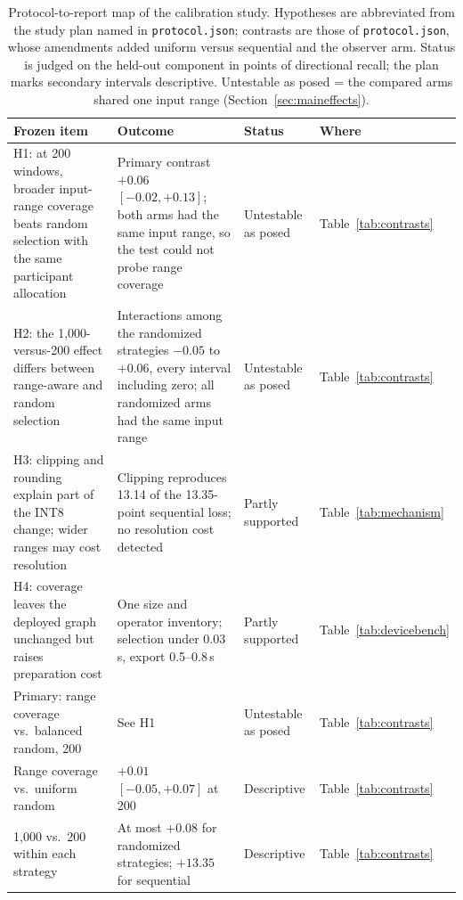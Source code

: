 \documentclass[10pt,twocolumn]{article}
\begin{document}
\begin{table}[!tp]
\centering
\caption{Protocol-to-report map of the calibration study. Hypotheses are
abbreviated from the study plan named in \texttt{protocol.json}; contrasts
are those of \texttt{protocol.json}, whose amendments added uniform versus
sequential and the observer arm. Status is judged on the held-out
component in points of directional recall; the plan marks secondary
intervals descriptive. Untestable as posed = the compared arms shared one
input range (Section~\ref{sec:maineffects}).}
\label{tab:protocolmap}
\small
\begin{tabular}{@{}p{}p{}ll@{}}
\toprule
Frozen item & Outcome & Status & Where \\
\midrule
\raggedright H1: at 200 windows, broader input-range coverage beats random
selection with the same participant allocation
  & \raggedright Primary contrast $+0.06$ $[-0.02, +0.13]$; both arms had
    the same input range, so the test could not probe range coverage
  & Untestable as posed & Table~\ref{tab:contrasts} \\
\raggedright H2: the 1,000-versus-200 effect differs between range-aware
and random selection
  & \raggedright Interactions among the randomized strategies $-0.05$ to
    $+0.06$, every interval including zero; all randomized arms had the
    same input range
  & Untestable as posed & Table~\ref{tab:contrasts} \\
\raggedright H3: clipping and rounding explain part of the INT8 change;
wider ranges may cost resolution
  & \raggedright Clipping reproduces 13.14 of the 13.35-point sequential
    loss; no resolution cost detected
  & Partly supported & Table~\ref{tab:mechanism} \\
\raggedright H4: coverage leaves the deployed graph unchanged but raises
preparation cost
  & \raggedright One size and operator inventory; selection under
    0.03\,s, export 0.5--0.8\,s
  & Partly supported & Table~\ref{tab:devicebench} \\
\midrule
\raggedright Primary: range coverage vs.\ balanced random, 200
  & \raggedright See H1 & Untestable as posed & Table~\ref{tab:contrasts} \\
\raggedright Range coverage vs.\ uniform random
  & \raggedright $+0.01$ $[-0.05, +0.07]$ at 200
  & Descriptive & Table~\ref{tab:contrasts} \\
\raggedright 1,000 vs.\ 200 within each strategy
  & \raggedright At most $+0.08$ for randomized strategies; $+13.35$ for
    sequential
  & Descriptive & Table~\ref{tab:contrasts} \\

\end{tabular}
\end{table}
\end{document}
